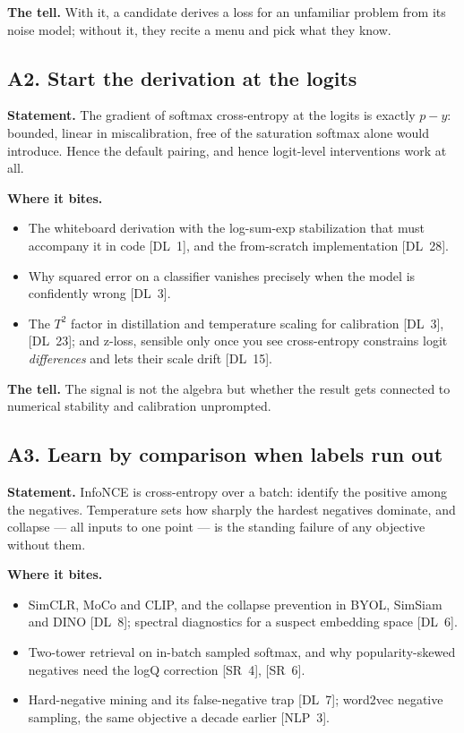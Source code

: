 \textbf{The tell.} With it, a candidate derives a loss for an unfamiliar problem from its noise model; without it, they recite a menu and pick what they know.

\subsection*{A2. Start the derivation at the logits}

\textbf{Statement.} The gradient of softmax cross-entropy at the logits is exactly $p - y$: bounded, linear in miscalibration, free of the saturation softmax alone would introduce. Hence the default pairing, and hence logit-level interventions work at all.

\textbf{Where it bites.}
\begin{itemize}[itemsep=1pt,topsep=2pt,leftmargin=1.3em]
\item The whiteboard derivation with the log-sum-exp stabilization that must accompany it in code [DL~1], and the from-scratch implementation [DL~28].
\item Why squared error on a classifier vanishes precisely when the model is confidently wrong [DL~3].
\item The $T^2$ factor in distillation and temperature scaling for calibration [DL~3], [DL~23]; and z-loss, sensible only once you see cross-entropy constrains logit \emph{differences} and lets their scale drift [DL~15].
\end{itemize}

\textbf{The tell.} The signal is not the algebra but whether the result gets connected to numerical stability and calibration unprompted.

\subsection*{A3. Learn by comparison when labels run out}

\textbf{Statement.} InfoNCE is cross-entropy over a batch: identify the positive among the negatives. Temperature sets how sharply the hardest negatives dominate, and collapse --- all inputs to one point --- is the standing failure of any objective without them.

\textbf{Where it bites.}
\begin{itemize}[itemsep=1pt,topsep=2pt,leftmargin=1.3em]
\item SimCLR, MoCo and CLIP, and the collapse prevention in BYOL, SimSiam and DINO [DL~8]; spectral diagnostics for a suspect embedding space [DL~6].
\item Two-tower retrieval on in-batch sampled softmax, and why popularity-skewed negatives need the logQ correction [SR~4], [SR~6].
\item Hard-negative mining and its false-negative trap [DL~7]; word2vec negative sampling, the same objective a decade earlier [NLP~3].
\end{itemize}

